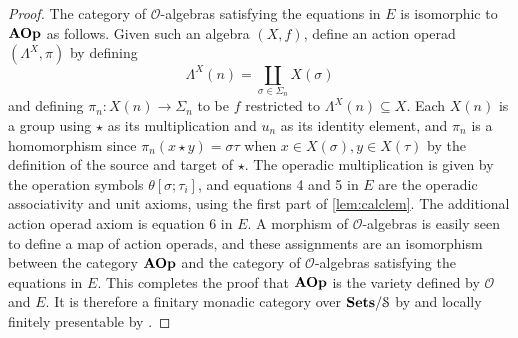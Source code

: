 \begin{proof}
The category of $\mathcal{O}$-algebras satisfying the equations in $E$ is isomorphic to $\mathbf{AOp}$ as follows. Given such an algebra $(X, f)$, define an action operad $(\Lambda^X, \pi)$ by defining 
\[
\Lambda^X(n) = \coprod_{\sigma \in \Sigma_n} X(\sigma)
\]
and defining $\pi_n \colon X(n) \to \Sigma_n$ to be $f$ restricted to $\Lambda^X(n) \subseteq X$. Each $X(n)$ is a group using $\star$ as its multiplication and $u_n$ as its identity element, and $\pi_n$ is a homomorphism since $\pi_n(x \star y) = \sigma \tau$ when $x \in X(\sigma), y \in X(\tau)$ by the definition of the source and target of $\star$. The operadic multiplication is given by the operation symbols $\theta[\sigma; \tau_i]$, and equations 4 and 5 in $E$ are the operadic associativity and unit axioms, using the first part of \cref{lem:calclem}. The additional action operad axiom is equation 6 in $E$. A morphism of $\mathcal{O}$-algebras is easily seen to define a map of action operads, and these assignments are an isomorphism between the category $\mathbf{AOp}$ and the category of $\mathcal{O}$-algebras satisfying the equations in $E$.
This completes the proof that $\mathbf{AOp}$ is the variety defined by $\mathcal{O}$ and $E$. It is therefore a finitary monadic category over $\mathbf{Sets}/\mathcal{S}$ by \cite[Thm~3.18]{ar} and locally finitely presentable by \cite[Cor~3.7]{ar}.
\end{proof}


